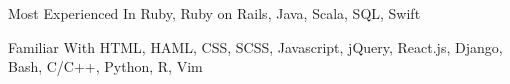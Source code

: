 


\begin{cvskills}


  \cvskill
  {Most Experienced In}
  {Ruby, Ruby on Rails, Java, Scala, SQL, Swift}


  \cvskill
  {Familiar With}
  {HTML, HAML, CSS, SCSS, Javascript, jQuery, React.js, Django, Bash, C/C++, Python, R, Vim}




\end{cvskills}
